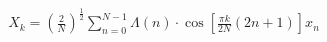 \documentclass[preview]{standalone}
\begin{document}
\begin{align*}
X_k = \left(\frac{2}{N}\right)^{\frac{1}{2}} \sum_{n=0}^{N-1} \Lambda(n) \cdot \cos \left[\frac{\pi k}{2N}(2n+1)\right]x_n
\end{align*}
\end{document}
